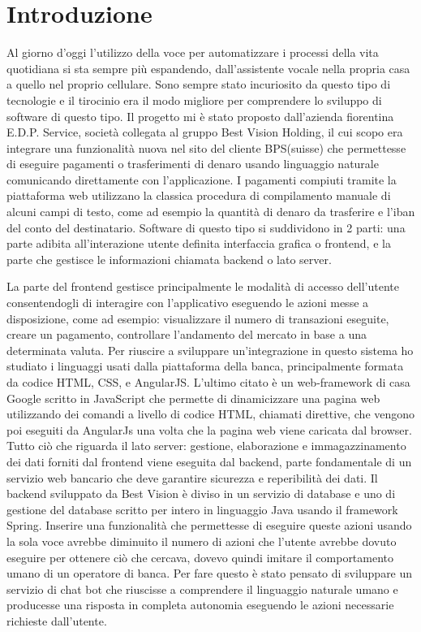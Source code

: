 \chapter{Introduzione}
Al giorno d'oggi l'utilizzo della voce per automatizzare i processi della vita quotidiana si sta sempre più espandendo, dall'assistente vocale nella propria casa a quello nel proprio cellulare. Sono sempre stato incuriosito da questo tipo di tecnologie e il tirocinio era il modo migliore per comprendere lo sviluppo di software di questo tipo. Il progetto mi è stato proposto dall'azienda fiorentina E.D.P. Service, società collegata al gruppo Best Vision Holding, il cui scopo era integrare una funzionalità nuova nel sito del cliente BPS(suisse) che permettesse di eseguire pagamenti o trasferimenti di denaro usando linguaggio naturale comunicando direttamente con l'applicazione.
I pagamenti compiuti tramite la piattaforma web utilizzano la classica procedura di compilamento manuale di alcuni campi di testo, come ad esempio la quantità di denaro da trasferire e l'iban del conto del destinatario.
Software di questo tipo si suddividono in 2 parti: una parte adibita all'interazione utente definita interfaccia grafica o frontend, e la parte che gestisce le informazioni chiamata backend o lato server.

La parte del frontend gestisce principalmente le modalità di accesso dell'utente consentendogli di interagire con l'applicativo eseguendo le azioni messe a disposizione, come ad esempio: visualizzare il numero di transazioni eseguite, creare un pagamento, controllare l'andamento del mercato in base a una determinata valuta.
Per riuscire a sviluppare un'integrazione in questo sistema ho studiato i linguaggi usati dalla piattaforma della banca, principalmente formata da codice HTML, CSS, e AngularJS.
L'ultimo citato è un web-framework di casa Google scritto in JavaScript che permette di dinamicizzare una pagina web utilizzando dei comandi a livello di codice HTML, chiamati direttive, che vengono poi eseguiti da AngularJs una volta che la pagina web viene caricata dal browser.
Tutto ciò che riguarda il lato server: gestione, elaborazione e immagazzinamento dei dati forniti dal frontend viene eseguita dal backend, parte fondamentale di un servizio web bancario che deve garantire sicurezza e reperibilità dei dati. Il backend sviluppato da Best Vision è diviso in un servizio di database e uno di gestione del database scritto per intero in linguaggio Java usando il framework Spring.
Inserire una funzionalità che permettesse di eseguire queste azioni usando la sola voce avrebbe diminuito il numero di azioni che l'utente avrebbe dovuto eseguire per ottenere ciò che cercava, dovevo quindi imitare il comportamento umano di un operatore di banca. Per fare questo è stato pensato di sviluppare un servizio di chat bot che riuscisse a comprendere il linguaggio naturale umano e producesse una risposta in completa autonomia eseguendo le azioni necessarie richieste dall'utente.
